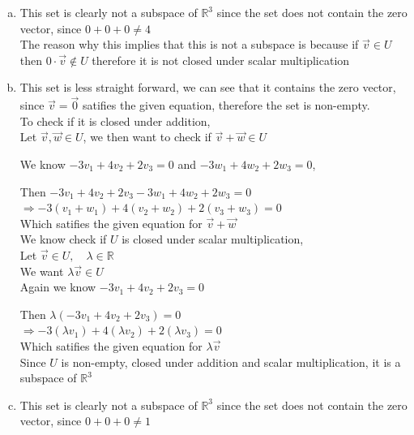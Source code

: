 \documentclass{article}
\begin{document}
\begin{enumerate}[(a)]
    \item This set is clearly not a subspace of \(\mathbb{R}^3\) since the set does not contain the zero vector, since \(0+0+0 \neq 4\)
    \\
    The reason why this implies that this is not a subspace is because if \(\vec{v} \in U\) then \(0 \cdot \vec{v} \notin U\)
    therefore it is not closed under scalar multiplication

    \item This set is less straight forward, we can see that it contains the zero vector, since 
    \(\vec{v} = \vec{0}\) satifies the given equation, therefore the set is non-empty.\\
    
    To check if it is closed under addition, \\
    Let \(\vec{v}, \vec{w} \in U\), we then want to check if \(\vec{v} + \vec{w} \in U\)
    
    We know \(-3v_1 + 4v_2 + 2v_3 = 0\) and \(-3w_1 + 4w_2 + 2w_3 = 0\), 
    
    Then
    \(-3v_1 + 4v_2 + 2v_3 -3w_1 + 4w_2 + 2w_3 = 0\) \\
    \(\Rightarrow -3(v_1+w_1) + 4(v_2+w_2) + 2(v_3+w_3) = 0\) \\
    Which satifies the given equation for \(\vec{v} + \vec{w}\)\\

    We know check if \(U\) is closed under scalar multiplication,\\
    Let \(\vec{v} \in U, \quad \lambda \in \mathbb{R}\) \\
    We want \(\lambda \vec{v} \in U\) \\
    Again we know \(-3v_1 + 4v_2 + 2v_3 = 0\)
    
    Then \(\lambda (-3v_1 + 4v_2 + 2v_3) = 0\) \\
    \(\Rightarrow -3(\lambda v_1) + 4(\lambda v_2)  + 2(\lambda v_3) = 0\)\\
    Which satifies the given equation for \(\lambda \vec{v}\)\\

    Since \(U\) is non-empty, closed under addition and scalar multiplication, 
    it is a subspace of \(\mathbb{R}^3\)

    \item This set is clearly not a subspace of \(\mathbb{R}^3\) since the set does not contain the zero vector, since \(0+0+0 \neq 1\)


\end{enumerate}
\end{document}
